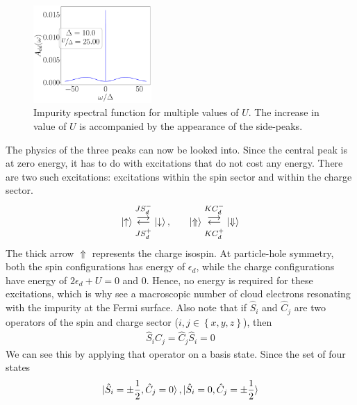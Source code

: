 \documentclass{report}
\numberwithin{equation}{section}
\begin{document}
\begin{figure}[!htb]
	\includegraphics[width=0.4\textwidth]{../figures/spec_func_Ub=0_U_by_delta=25.00.pdf}
	\caption{Impurity spectral function for multiple values of \(U\). The increase in value of \(U\) is accompanied by the appearance of the side-peaks.}
	\label{spec_func}
\end{figure}
The physics of the three peaks can now be looked into. Since the central peak is at zero energy, it has to do with excitations that do not cost any energy. There are two such excitations: excitations within the spin sector and within the charge sector.
\begin{equation}\begin{aligned}
	\ket{\uparrow} \mathrel{\mathlarger{\mathlarger{\mathop{\rightleftarrows}}^{J S_d^-}_{JS_d^+}}}\ket{\downarrow}, &&&&\ket{\Uparrow} \mathrel{\mathlarger{\mathlarger{\mathop{\rightleftarrows}}^{K C_d^-}_{K C_d^+}}}\ket{\Downarrow}\\
\end{aligned}\end{equation}
The thick arrow \(\Uparrow\) represents the charge isospin. At particle-hole symmetry, both the spin configurations has energy of \(\epsilon_d\), while the charge configurations have energy of \(2\epsilon_d + U=0\) and 0. Hence, no energy is required for these excitations, which is why see a macroscopic number of cloud electrons resonating with the impurity at the Fermi surface. Also note that if \(\hat S_i\) and \(\hat C_j\) are two operators of the spin and charge sector (\(i,j \in \left\{ x,y,z \right\} \)), then
\begin{equation}\begin{aligned}
	\hat S_i \hat C_j = \hat C_j \hat S_i = 0
\end{aligned}\end{equation}
We can see this by applying that operator on a basis state. Since the set of four states 
\begin{equation}\begin{aligned}
	\ket{\hat S_i = \pm \frac{1}{2}, \hat C_j = 0}, \ket{\hat S_i = 0, \hat C_j = \pm\frac{1}{2}}
\end{aligned}\end{equation}
\end{document}
